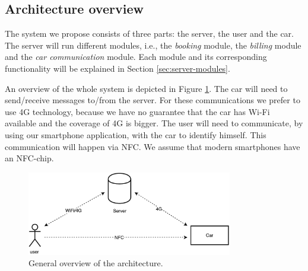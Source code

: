 \documentclass[12pt,a4paper, oneside]{article}
\begin{document}
\subsection{Architecture overview}
The system we propose consists of three parts: the server, the user and the car. The server will run different modules, i.e., the \textit{booking} module, the \textit{billing} module and the \textit{car communication} module. Each module and its corresponding functionality will be explained in Section \ref{sec:server-modules}. \par
An overview of the whole system is depicted in Figure \ref{fig:architecture}. The car will need to send/receive messages to/from the server. For these communications we prefer to use 4G technology, because we have no guarantee that the car has Wi-Fi available and the coverage of 4G is bigger. The user will need to communicate, by using our smartphone application, with the car to identify himself. This communication will happen via NFC. We assume that modern smartphones have an NFC-chip.

\begin{figure}[H]
\centering
\includegraphics[width=0.8\textwidth]{assets/architecture}
\caption{General overview of the architecture.}
\label{fig:architecture}
\end{figure}
\end{document}
